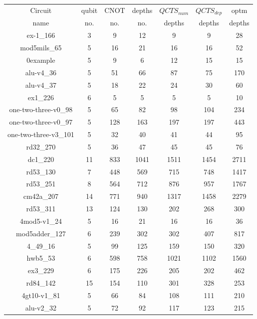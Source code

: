\documentclass[runningheads]{llncs}
\begin{document}
						\begin{table}[H]
							\begin{center}  
							\begin{tabular}{|c|c|c|c|c|c|c|}
							\hline
							Circuit &  qubit  & CNOT &depths &$QCTS_{num}$& $QCTS_{dep}$  & optm 	  	\\
							 name	&   no. 	&	no. & no. & depths&  depths &  depths 	\\
							\hline
							ex-1\_166 & 3 & 9 & 12 & 9 & 9 & 28 \\
							mod5mils\_65 & 5 & 16 & 21 & 16 & 16 & 52 \\
							0example & 5 & 9 & 6 & 12 & 15 & 15 \\
							alu-v4\_36 & 5 & 51 & 66 & 87 & 75 & 170 \\
							alu-v4\_37 & 5 & 18 & 22 & 24 & 30 & 60 \\
							ex1\_226 & 6 & 5 & 5 & 5 & 5 & 10 \\
							one-two-three-v0\_98 & 5 & 65 & 82 & 98 & 104 & 234 \\
							one-two-three-v0\_97 & 5 & 128 & 163 & 197 & 197 & 443 \\
							one-two-three-v3\_101 & 5 & 32 & 40 & 41 & 44 & 95 \\
							rd32\_270 & 5 & 36 & 47 & 45 & 45 & 76 \\
							dc1\_220 & 11 & 833 & 1041 & 1511 & 1454 & 2711 \\
							rd53\_130 & 7 & 448 & 569 & 715 & 748 & 1417 \\
							rd53\_251 & 8 & 564 & 712 & 876 & 957 & 1767 \\
							cm42a\_207 & 14 & 771 & 940 & 1317 & 1458 & 2279 \\
							rd53\_311 & 13 & 124 & 130 & 202 & 268 & 300 \\
							4mod5-v1\_24 & 5 & 16 & 21 & 16 & 16 & 36 \\
							mod5adder\_127 & 6 & 239 & 302 & 302 & 407 & 817 \\
							4\_49\_16 & 5 & 99 & 125 & 159 & 150 & 320 \\
							hwb5\_53 & 6 & 598 & 758 & 1021 & 1102 & 1560 \\
							ex3\_229 & 6 & 175 & 226 & 205 & 202 & 462 \\
							rd84\_142 & 15 & 154 & 110 & 301 & 328 & 253 \\
							4gt10-v1\_81 & 5 & 66 & 84 & 108 & 111 & 210 \\
							alu-v2\_32 & 5 & 72 & 92 & 117 & 123 & 215 \\

\end{tabular}
\end{center}
\end{table}
\end{document}
